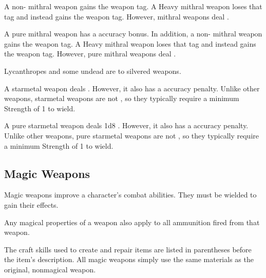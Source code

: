        A non- mithral weapon gains the  weapon tag.
      A Heavy mithral weapon loses that tag and instead gains the  weapon tag.
      However, mithral weapons deal  .

       A pure mithral weapon has a  accuracy bonus.
      In addition, a non- mithral weapon gains the  weapon tag.
      A Heavy mithral weapon loses that tag and instead gains the  weapon tag.
      However, pure mithral weapons deal  .

       Lycanthropes and some undead are  to silvered weapons.

       A starmetal weapon deals  .
      However, it also has a  accuracy penalty.
      Unlike other weapons, starmetal weapons are not , so they typically require a minimum Strength of 1 to wield.

       A pure starmetal weapon deals \plus1d8 .
      However, it also has a  accuracy penalty.
      Unlike other weapons, pure starmetal weapons are not , so they typically require a minimum Strength of 1 to wield.

      \begin{longcolumn}
        \section{Magic Weapons}
          \begin{longtablepreface}

            Magic weapons improve a character's combat abilities.
            They must be wielded to gain their effects.

             Any magical properties of a  weapon also apply to all ammunition fired from that weapon.

             The craft skills used to create and repair items are listed in parentheses before the item's description.
            All magic weapons simply use the same materials as the original, nonmagical weapon.
          \end{longtablepreface}

          

      \end{longcolumn}

